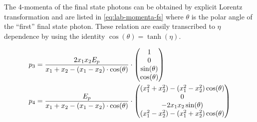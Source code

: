 The 4-momenta of the final state photons can be obtained by explicit
Lorentz transformation and are listed in \cref{eq:lab-momenta-fs}
where \(\theta\) is the polar angle of the ``first'' final state
photon.  These relation are easily transcribed to \(\eta\) dependence
by using the identity \(\cos(\theta) = \tanh(\eta)\).

%
\begin{align}
  \label{eq:lab-momenta-fs}
  p_3 &= \frac{2x_1x_2E_p}{x_1+x_2 - (x_1 - x_2)\cdot\cos(\theta)}\cdot
  \mqty(1 \\ 0 \\ \sin(\theta) \\ \cos(\theta)) \\
  p_4 &= \frac{E_p}{x_1+x_2 - (x_1 - x_2)\cdot\cos(\theta)}\cdot
  \mqty((x_1^2+x_2^2) - (x_1^2-x_2^2)\cos(\theta) \\ 0 \\ -2x_1x_2\sin(\theta) \\ (x_1^2-x_2^2) - (x_1^2+x_2^2)\cos(\theta))
\end{align}
%
